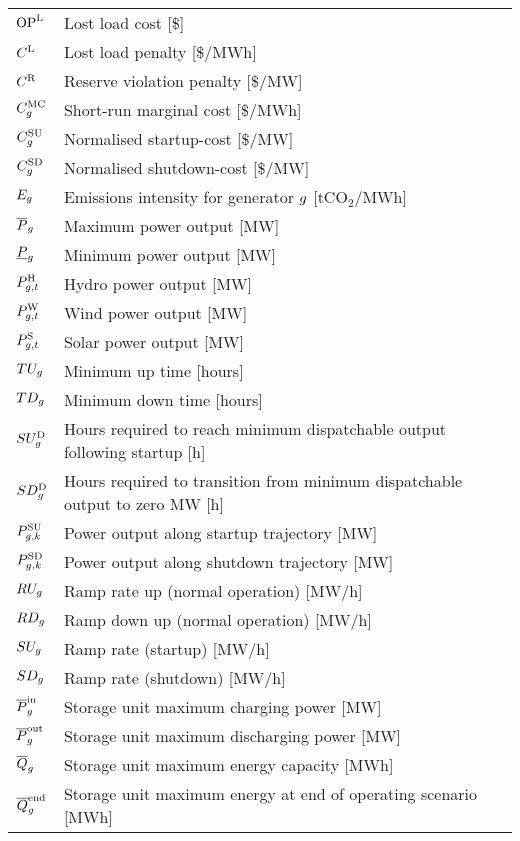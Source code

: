 \documentclass{article}
\begin{document}
\begin{longtable}{ p{}  p{}}
	$\mathrm{OP}^{\mathrm{L}}_{}$ & Lost load cost [\$]\\
	$C^{\mathrm{L}}$ & Lost load penalty [\$/MWh]\\
	$C^{\mathrm{R}}$ & Reserve violation penalty [\$/MW]\\
	$C^{\mathrm{MC}}_{g}$ & Short-run marginal cost [\$/MWh]\\
	$C^{\mathrm{SU}}_{g}$ & Normalised startup-cost [\$/MW]\\
	$C^{\mathrm{SD}}_{g}$ & Normalised shutdown-cost [\$/MW]\\
	$E_{g}$ & Emissions intensity for generator $g$ [tCO$_{2}$/MWh]\\
	$\overline{P}_{g}$ & Maximum power output [MW]\\
	$\underline{P}_{g}$ & Minimum power output [MW]\\
	$P^{\mathrm{H}}_{g,t}$ & Hydro power output [MW]\\
	$P_{g,t}^{\mathrm{W}}$ & Wind power output [MW]\\
	$P_{g,t}^{\mathrm{S}}$ & Solar power output [MW]\\
	$TU_{g}$ & Minimum up time [hours]\\
	$TD_{g}$ & Minimum down time [hours]\\
	$SU_{g}^{\mathrm{D}}$ & Hours required to reach minimum dispatchable output following startup [h]\\
	$SD_{g}^{\mathrm{D}}$ & Hours required to transition from minimum dispatchable output to zero MW [h]\\
	$P^{\mathrm{SU}}_{g,k}$ & Power output along startup trajectory [MW]\\
	$P^{\mathrm{SD}}_{g,k}$ & Power output along shutdown trajectory [MW]\\
	$RU_{g}$ & Ramp rate up (normal operation) [MW/h]\\
	$RD_{g}$ & Ramp down up (normal operation) [MW/h]\\
	$SU_{g}$ & Ramp rate (startup) [MW/h]\\
	$SD_{g}$ & Ramp rate (shutdown) [MW/h]\\
	$\overline{P}^{\mathrm{in}}_{g}$ & Storage unit maximum charging power [MW]\\
	$\overline{P}^{\mathrm{out}}_{g}$ & Storage unit maximum discharging power [MW]\\
	$\overline{Q}_{g}$ & Storage unit maximum energy capacity [MWh]\\
	$\overline{Q}^{\mathrm{end}}_{g}$ & Storage unit maximum energy at end of operating scenario [MWh]\\

\end{longtable}
\end{document}
